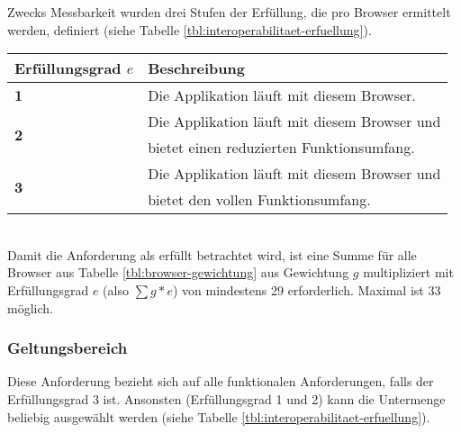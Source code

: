 Zwecks Messbarkeit wurden drei Stufen der Erfüllung, die pro Browser ermittelt
werden, definiert (siehe Tabelle \ref{tbl:interoperabilitaet-erfuellung}).
\\[\intextsep]
\begin{minipage}{\linewidth}
	\centering
	\begin{tabular}{ll}
		\hline
		Erfüllungsgrad $e$ & Beschreibung \\
		\hline
		\textbf{1}
		 & Die Applikation läuft mit diesem Browser. \\
		\multirow{2}{*}{\textbf{2}}
		 & Die Applikation läuft mit diesem Browser und \\
		 & bietet einen reduzierten Funktionsumfang. \\
		\multirow{2}{*}{\textbf{3}}
		 & Die Applikation läuft mit diesem Browser und \\
		 & bietet den vollen Funktionsumfang. \\
		\hline
	\end{tabular}
	\label{tbl:interoperabilitaet-erfuellung}
\end{minipage}
\\[\intextsep]
Damit die Anforderung als erfüllt betrachtet wird, ist eine Summe für alle
Browser aus Tabelle \ref{tbl:browser-gewichtung} aus Gewichtung $g$
multipliziert mit Erfüllungsgrad $e$ (also $ \sum g * e $) von mindestens 29
erforderlich. Maximal ist 33 möglich.

\subsubsection{Geltungsbereich}

Diese Anforderung bezieht sich auf alle funktionalen Anforderungen, falls der
Erfüllungsgrad 3 ist. Ansonsten (Erfüllungsgrad 1 und 2) kann die Untermenge
beliebig ausgewählt werden (siehe Tabelle
\ref{tbl:interoperabilitaet-erfuellung}).
